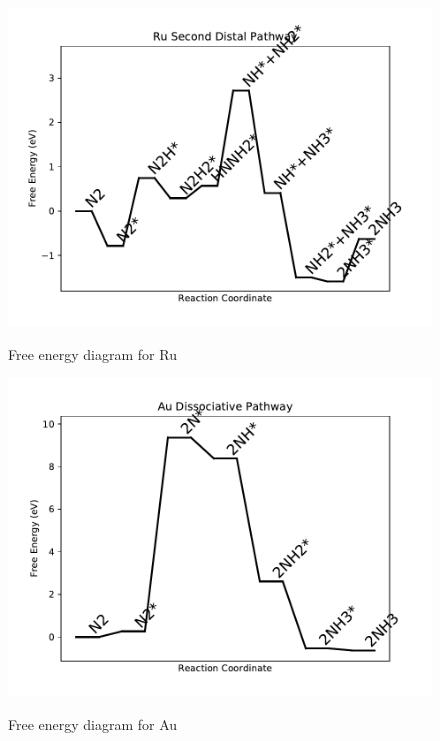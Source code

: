 \documentclass{article}
\begin{document}
\begin{figure}
\includegraphics[width=1\linewidth]{data/plots/Ru_distal_2.pdf}
\label{fig:Ru_distal_2}
\caption{Free energy diagram for Ru}
\end{figure}

\begin{figure}
\includegraphics[width=1\linewidth]{data/plots/Au_dissociative.pdf}
\label{fig:Au_dissociative}
\caption{Free energy diagram for Au}
\end{figure}
\end{document}
